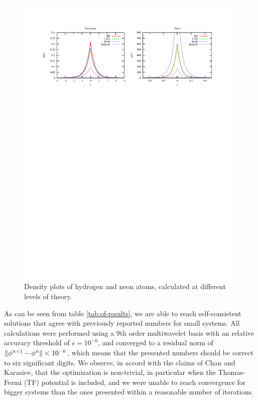 \begin{figure}
    \centering
    \includegraphics[scale=0.7, viewport = 50 560 550 755]{figures/of_atoms.pdf}
    \caption{\footnotesize{Density plots of hydrogen and neon atoms, calculated at different
	levels of theory.}}
    \label{fig:of-atoms}
\end{figure}

As can be seen from table \ref{tab:of-results}, we are able to reach self-consistent solutions that agree 
with previously reported numbers for small systems. All calculations were performed using a 9th order 
multiwavelet basis with an relative accuracy threshold of $\epsilon=10^{-6}$, and converged to a residual norm 
of $\|\phi^{n+1}-\phi^n\| < 10^{-6}$, which means that the presented numbers should be correct to
six significant digits. We observe, in accord with the claims of Chan and Karasiev, that the optimization is 
non-trivial, in particular when the Thomas-Fermi (TF) potential is included, and we were unable to reach convergence 
for bigger systems than the ones presented within a reasonable number of iterations. 

